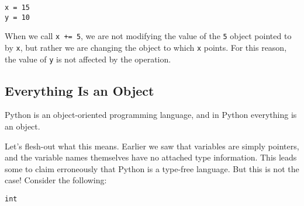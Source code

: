 \begin{Shaded}
\begin{Highlighting}[]
\OperatorTok{=} 
\OperatorTok{=} 
\OperatorTok{+=}   
\NormalTok{(}
\NormalTok{(}
\end{Highlighting}
\end{Shaded}

\begin{verbatim}
x = 15
y = 10
\end{verbatim}

When we call \texttt{x\ +=\ 5}, we are not modifying the value of the
\texttt{5} object pointed to by \texttt{x}, but rather we are changing
the object to which \texttt{x} points. For this reason, the value of
\texttt{y} is not affected by the operation.

\subsection{Everything Is an Object}\label{everything-is-an-object}

Python is an object-oriented programming language, and in Python
everything is an object.

Let's flesh-out what this means. Earlier we saw that variables are
simply pointers, and the variable names themselves have no attached type
information. This leads some to claim erroneously that Python is a
type-free language. But this is not the case! Consider the following:

\begin{Shaded}
\begin{Highlighting}[]
\OperatorTok{=} 
\end{Highlighting}
\end{Shaded}

\begin{verbatim}
int
\end{verbatim}

\begin{Shaded}
\begin{Highlighting}[]
\OperatorTok{=} 
\end{Highlighting}
\end{Shaded}

